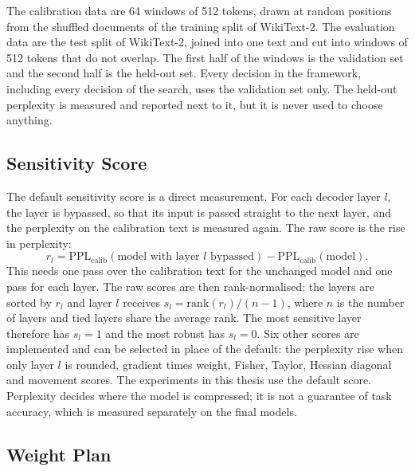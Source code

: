 \documentclass[
11pt, %
english, %
singlespacing, %
headsepline, %
]{MastersDoctoralThesis} %
\begin{document}
The calibration data are 64 windows of 512 tokens, drawn at random positions from the shuffled documents of the training split of WikiText-2. The evaluation data are the test split of WikiText-2, joined into one text and cut into windows of 512 tokens that do not overlap. The first half of the windows is the validation set and the second half is the held-out set. Every decision in the framework, including every decision of the search, uses the validation set only. The held-out perplexity is measured and reported next to it, but it is never used to choose anything.

\subsection{Sensitivity Score}
\label{sec:ch4-score}

The default sensitivity score is a direct measurement. For each decoder layer $l$, the layer is bypassed, so that its input is passed straight to the next layer, and the perplexity on the calibration text is measured again. The raw score is the rise in perplexity:
\begin{equation}
  r_l = \mathrm{PPL}_{\mathrm{calib}}(\text{model with layer } l \text{ bypassed}) - \mathrm{PPL}_{\mathrm{calib}}(\text{model}).
  \label{eq:ch4-score}
\end{equation}
This needs one pass over the calibration text for the unchanged model and one pass for each layer. The raw scores are then rank-normalised: the layers are sorted by $r_l$ and layer $l$ receives $s_l = \mathrm{rank}(r_l) / (n - 1)$, where $n$ is the number of layers and tied layers share the average rank. The most sensitive layer therefore has $s_l = 1$ and the most robust has $s_l = 0$. Six other scores are implemented and can be selected in place of the default: the perplexity rise when only layer $l$ is rounded, gradient times weight, Fisher, Taylor, Hessian diagonal and movement scores. The experiments in this thesis use the default score. Perplexity decides where the model is compressed; it is not a guarantee of task accuracy, which is measured separately on the final models.

\subsection{Weight Plan}
\label{sec:ch4-weightplan}
\end{document}
